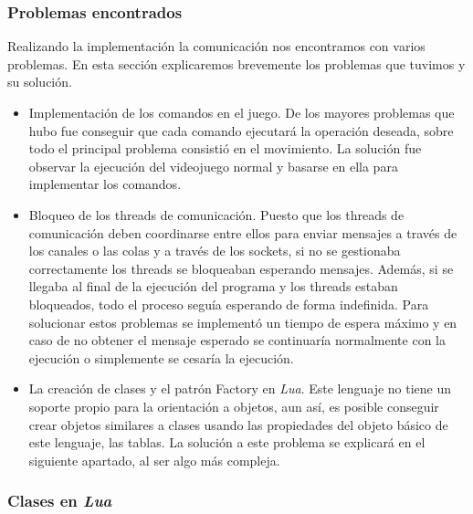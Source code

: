 \subsubsection*{Problemas encontrados}

Realizando la implementación la comunicación nos encontramos con varios problemas. En esta sección explicaremos brevemente los problemas que tuvimos y su solución.

\begin{itemize}
    \item Implementación de los comandos en el juego. De los mayores problemas que hubo fue conseguir que cada comando ejecutará la operación deseada, sobre todo el principal problema consistió en el movimiento. La solución fue observar la ejecución del videojuego normal y basarse en ella para implementar los comandos.
    \item Bloqueo de los threads de comunicación. Puesto que los threads de comunicación deben coordinarse entre ellos para enviar mensajes a través de los canales o las colas y a través de los sockets, si no se gestionaba correctamente los threads se bloqueaban esperando mensajes. Además, si se llegaba al final de la ejecución del programa y los threads estaban bloqueados, todo el proceso seguía esperando de forma indefinida. Para solucionar estos problemas se implementó un tiempo de espera máximo y en caso de no obtener el mensaje esperado se continuaría normalmente con la ejecución o simplemente se cesaría la ejecución.
    \item La creación de clases y el patrón Factory en \textit{Lua}. Este lenguaje no tiene un soporte propio para la orientación a objetos, aun así, es posible conseguir crear objetos similares a clases usando las propiedades del objeto básico de este lenguaje, las tablas. La solución a este problema se explicará en el siguiente apartado, al ser algo más compleja.
\end{itemize}

\subsubsection*{Clases en \textit{Lua}}

